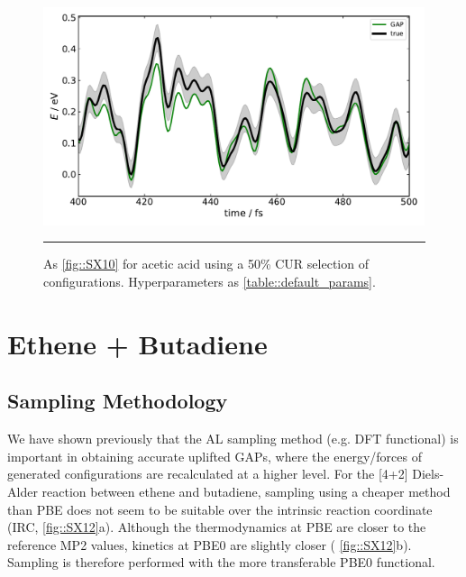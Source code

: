 \documentclass[11pt]{article}
\numberwithin{equation}{subsection}
\begin{document}
\begin{figure}[h!]
	\centering
	\vspace{0.4cm}
	\includegraphics[height=6.4cm]{figSX11.pdf}
	\vspace{0.1cm}
	\hrule
	\vspace{0.1cm}
	\caption{As \figurename{ \ref{fig::SX10}} for acetic acid using a 50\% CUR selection of configurations. Hyperparameters as \tablename{ \ref{table::default_params}}.}
	\label{fig::SX11}
\end{figure}





\clearpage
\section{Ethene + Butadiene}
\subsection{Sampling Methodology}

We have shown previously that the AL sampling method (e.g. DFT functional) is important in obtaining accurate uplifted GAPs,\supercite{gaptrain2021} where the energy/forces of generated configurations are recalculated at a higher level. For the [4+2] Diels-Alder reaction between ethene and butadiene, sampling using a cheaper method than PBE does not seem to be suitable over the intrinsic reaction coordinate (IRC, \figurename{ \ref{fig::SX12}}a). Although the thermodynamics at PBE are closer to the reference MP2 values, kinetics at PBE0 are slightly closer (\figurename{ \ref{fig::SX12}}b). Sampling is therefore performed with the more transferable PBE0 functional.
\end{document}
